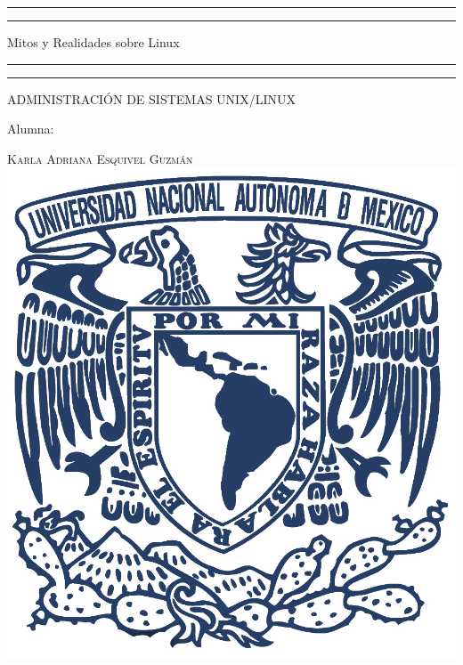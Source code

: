 \documentclass[a4paper, 11pt, oneside]{article}
\begin{document}
 

\begin{titlepage} 

	\centering 
	
	\scshape 
	
	\vspace*{\baselineskip} 
	
	
	
	\rule{\textwidth}{1.6pt}\vspace*{-\baselineskip}\vspace*{2pt} 
	\rule{\textwidth}{0.4pt} 
	
	\vspace{0.75\baselineskip} 
	
	{\LARGE Mitos y Realidades sobre Linux}	
	\vspace{0.75\baselineskip} 
	
	\rule{\textwidth}{0.4pt}\vspace*{-\baselineskip}\vspace{3.2pt}
	\rule{\textwidth}{1.6pt} 
	
	\vspace{2\baselineskip} 
	

	ADMINISTRACIÓN DE SISTEMAS UNIX/LINUX
	
	\vspace*{3\baselineskip} 
	
	
	
	Alumna:
	
	\vspace{0.5\baselineskip} 
	
	{\scshape\Large Karla Adriana Esquivel Guzmán \\} 
	\vspace{0.5\baselineskip} 
	\vfill
	\includegraphics{unam.jpg}
	

\end{titlepage}
\end{document}
